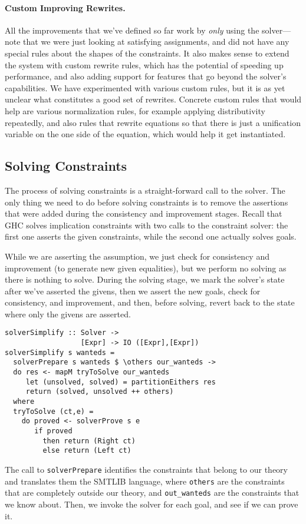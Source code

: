 \documentclass{sigplanconf}
\begin{document}
\paragraph{Custom Improving Rewrites.}
All the improvements that we've defined so far work by {\em only} using
the solver---note that we were just looking at satisfying assignments,
and did not have any special rules about the shapes of the constraints.
It also makes sense to extend the system with custom rewrite rules,
which has the potential of speeding up performance, and also adding
support for features that go beyond the solver's capabilities.
We have experimented with various custom rules, but it is as yet
unclear what constitutes a good set of rewrites.  Concrete custom
rules that would help are various normalization rules, for example
applying distributivity repeatedly, and also rules that rewrite
equations so that there is just a unification variable on the one
side of the equation, which would help it get instantiated.


\subsection{Solving Constraints}

The process of solving constraints is a straight-forward call to the
solver.  The only thing we need to do before solving constraints is
to remove the assertions that were added during the consistency and
improvement stages.  Recall that GHC solves implication constraints
with two calls to the constraint solver: the first one asserts
the given constraints, while the second one actually solves goals.

While we are asserting the assumption, we just check for consistency
and improvement (to generate new given equalities), but we perform
no solving as there is nothing to solve.  During the solving stage,
we mark the solver's state after we've asserted the givens,
then we assert the new goals, check for consistency, and improvement,
and then, before solving, revert back to the state where only
the givens are asserted.
\begin{Verbatim}
solverSimplify :: Solver ->
                  [Expr] -> IO ([Expr],[Expr])
solverSimplify s wanteds =
  solverPrepare s wanteds $ \others our_wanteds ->
  do res <- mapM tryToSolve our_wanteds
     let (unsolved, solved) = partitionEithers res
     return (solved, unsolved ++ others)
  where
  tryToSolve (ct,e) =
    do proved <- solverProve s e
       if proved
         then return (Right ct)
         else return (Left ct)
\end{Verbatim}
The call to \verb"solverPrepare" identifies the constraints that belong
to our theory and translates them the SMTLIB language, where \Verb"others"
are the constraints that are completely outside our theory, and
\Verb"out_wanteds" are the constraints that we know about. Then,
we invoke the solver for each goal, and see if we can prove it.
\end{document}
